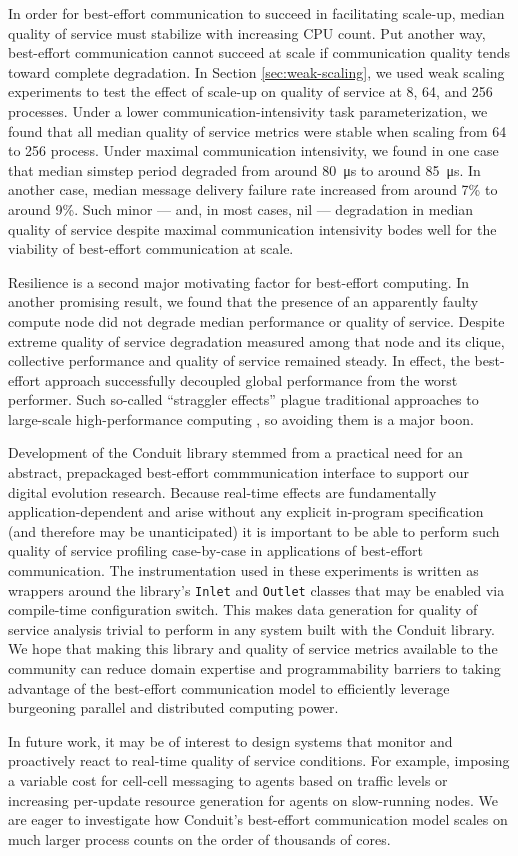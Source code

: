 In order for best-effort communication to succeed in facilitating scale-up, median quality of service must stabilize with increasing CPU count.
Put another way, best-effort communication cannot succeed at scale if communication quality tends toward complete degradation.
In Section \ref{sec:weak-scaling}, we used weak scaling experiments to test the effect of scale-up on quality of service at 8, 64, and 256 processes.
Under a lower communication-intensivity task parameterization, we found that all median quality of service metrics were stable when scaling from 64 to 256 process.
Under maximal communication intensivity, we found in one case that median simstep period degraded from around \SI{80}{\micro\second} to around \SI{85}{\micro\second}.
In another case, median message delivery failure rate increased from around 7\% to around 9\%.
Such minor --- and, in most cases, nil --- degradation in median quality of service despite maximal communication intensivity bodes well for the viability of best-effort communication at scale.

Resilience is a second major motivating factor for best-effort computing.
In another promising result, we found that the presence of an apparently faulty compute node did not degrade median performance or quality of service.
Despite extreme quality of service degradation measured among that node and its clique, collective performance and quality of service remained steady.
In effect, the best-effort approach successfully decoupled global performance from the worst performer.
Such so-called ``straggler effects'' plague traditional approaches to large-scale high-performance computing \citep{aktacs2019straggler}, so avoiding them is a major boon.

Development of the Conduit library stemmed from a practical need for an abstract, prepackaged best-effort commmunication interface to support our digital evolution research.
Because real-time effects are fundamentally application-dependent and arise without any explicit in-program specification (and therefore may be unanticipated) it is important to be able to perform such quality of service profiling case-by-case in applications of best-effort communication.
The instrumentation used in these experiments is written as wrappers around the library's \texttt{Inlet} and \texttt{Outlet} classes that may be enabled via compile-time configuration switch.
This makes data generation for quality of service analysis trivial to perform in any system built with the Conduit library.
We hope that making this library and quality of service metrics available to the community can reduce domain expertise and programmability barriers to taking advantage of the best-effort communication model to efficiently leverage burgeoning parallel and distributed computing power.

In future work, it may be of interest to design systems that monitor and proactively react to real-time quality of service conditions.
For example, imposing a variable cost for cell-cell messaging to agents based on traffic levels or increasing per-update resource generation for agents on slow-running nodes.
We are eager to investigate how Conduit's best-effort communication model scales on much larger process counts on the order of thousands of cores.
